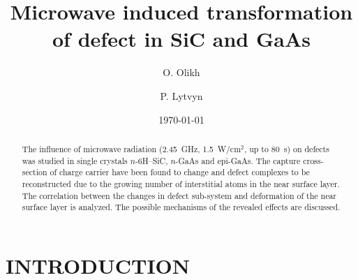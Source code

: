\documentclass[%
 aip,jap,
 amsmath,amssymb,
 reprint,%
]{revtex4-1}
\begin{document}
\title[]{Microwave induced transformation of defect in SiC and GaAs}
\author{O. Olikh}
\author{P. Lytvyn}%
%

\date{\today}%

\begin{abstract}
The influence of microwave radiation (2.45~GHz, 1.5~W/cm$^2$, up to 80~s) on defects was studied in single crystals $n$-6H–SiC, $n$-GaAs and epi-GaAs.
The capture cross-section of charge carrier have been found to change
and defect complexes to be reconstructed due to the growing number of  interstitial atoms in the near surface layer.
The correlation between the changes in defect sub-system and deformation of the near surface layer is analyzed.
The possible mechanisms of the revealed effects are discussed.
\end{abstract}


\maketitle


\section{\label{sec:Int}INTRODUCTION}
\end{document}
